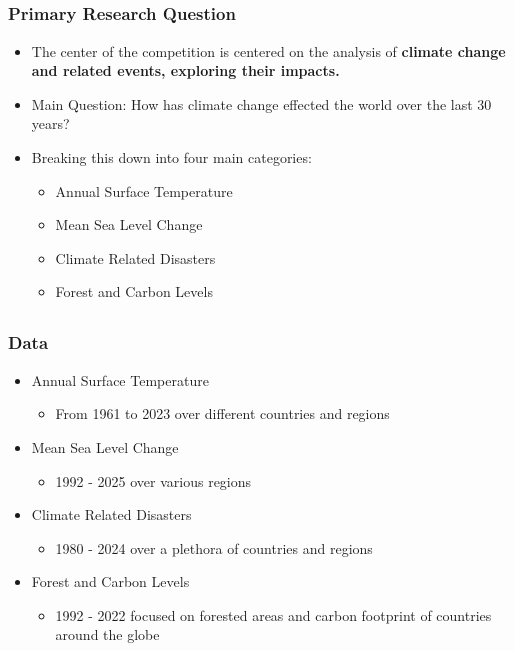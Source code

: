\documentclass[handout, xcolor=dvipsnames]{beamer}
\begin{document}
\subsection{}
\begin{frame}
	\frametitle{Primary Research Question}
	\begin{itemize}
    	\item The center of the competition is centered on the analysis of \textbf{climate change and related events, exploring their impacts.} 
    	\item Main Question: How has climate change effected the world over the last 30 years? 
    	\item Breaking this down into four main categories: 
            \begin{itemize}
                \item Annual Surface Temperature
                \item Mean Sea Level Change
                \item Climate Related Disasters
                \item Forest and Carbon Levels
            \end{itemize}
    \end{itemize}
\end{frame}


\subsection{}
\begin{frame}
	\frametitle{Data}
	\begin{itemize}
    	\item Annual Surface Temperature
            \begin{itemize}
                \item From 1961 to 2023 over different countries and regions
            \end{itemize}
    	\item Mean Sea Level Change
            \begin{itemize}
                \item 1992 - 2025 over various regions
            \end{itemize}
    	\item Climate Related Disasters
            \begin{itemize}
                \item 1980 - 2024 over a plethora of countries and regions
            \end{itemize}
            \item Forest and Carbon Levels
            \begin{itemize}
                \item 1992 - 2022 focused on forested areas and carbon footprint
                of countries around the globe
            \end{itemize}
    \end{itemize}
\end{frame}
\end{document}
